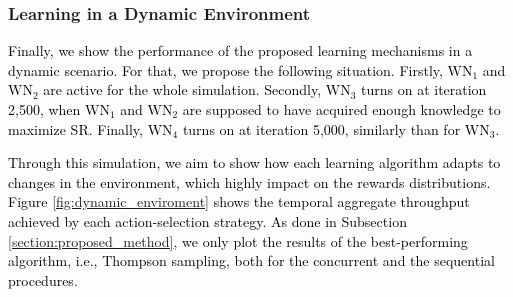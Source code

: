 \documentclass{article}
\begin{document}
	\subsubsection{Learning in a Dynamic Environment}
	\label{section:dynamic_environment}
	
	\textcolor{black}{Finally, we show the performance of the proposed learning mechanisms in a dynamic scenario. For that, we propose the following situation. Firstly, $\text{WN}_1$ and $\text{WN}_2$ are active for the whole simulation. Secondly, $\text{WN}_3$ turns on at iteration 2,500, when $\text{WN}_1$ and $\text{WN}_2$ are supposed to have acquired enough knowledge to maximize SR. Finally, $\text{WN}_4$ turns on at iteration 5,000, similarly than for $\text{WN}_3$.}
	
	\textcolor{black}{Through this simulation, we aim to show how each learning algorithm adapts to changes in the environment, which highly impact on the rewards distributions. Figure \ref{fig:dynamic_enviroment} shows the temporal aggregate throughput achieved by each action-selection strategy. As done in Subsection \ref{section:proposed_method}, we only plot the results of the best-performing algorithm, i.e., Thompson sampling, both for the concurrent and the sequential procedures.}
	
\end{document}
